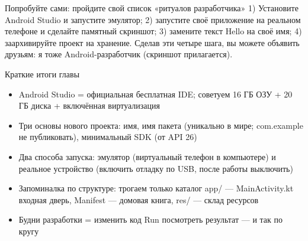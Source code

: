 \begin{tcbpractice}{Попробуйте сами: пройдите свой список «ритуалов разработчика»}
1) Установите Android Studio и запустите эмулятор; 2) запустите своё приложение на реальном телефоне и сделайте памятный скриншот; 3) замените текст Hello на своё имя; 4) заархивируйте проект на хранение. Сделав эти четыре шага, вы можете объявить друзьям: я тоже Android-разработчик (скриншот прилагается).

\end{tcbpractice}

\begin{tcbsummary}{Краткие итоги главы}
\begin{itemize}
  \item Android Studio = официальная бесплатная IDE; советуем 16 ГБ ОЗУ + 20 ГБ диска + включённая виртуализация
  \item Три основы нового проекта: имя, имя пакета (уникально в мире; com.example не публиковать), минимальный SDK (от API 26)
  \item Два способа запуска: эмулятор (виртуальный телефон в компьютере) и реальное устройство (включить отладку по USB, после работы выключить)
  \item Запоминалка по структуре: трогаем только каталог app/ — MainActivity.kt входная дверь, Manifest — домовая книга, res/ — склад ресурсов
  \item Будни разработки = изменить код Run посмотреть результат — и так по кругу
\end{itemize}

\end{tcbsummary}
